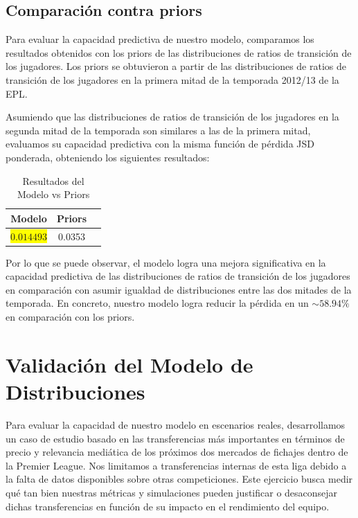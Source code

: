 \documentclass[
  a4paper,
]{article}
\begin{document}
\hypertarget{comparaciuxf3n-contra-priors}{%
\subsection{Comparación contra
priors}\label{comparaciuxf3n-contra-priors}}

Para evaluar la capacidad predictiva de nuestro modelo, comparamos los
resultados obtenidos con los priors de las distribuciones de ratios de
transición de los jugadores. Los priors se obtuvieron a partir de las
distribuciones de ratios de transición de los jugadores en la primera
mitad de la temporada 2012/13 de la EPL.

Asumiendo que las distribuciones de ratios de transición de los
jugadores en la segunda mitad de la temporada son similares a las de la
primera mitad, evaluamos su capacidad predictiva con la misma función de
pérdida JSD ponderada, obteniendo los siguientes resultados:

\begin{table}
\caption{Resultados del Modelo vs Priors}
\begin{center}
\begin{tabular}{|c|c|c|}
\hline
\textbf{Modelo} & \textbf{Priors} \\
\hline
\colorbox{yellow}{$0.014493$} & 0.0353 \\
\hline
\end{tabular}
\end{center}
\end{table}

Por lo que se puede observar, el modelo logra una mejora significativa
en la capacidad predictiva de las distribuciones de ratios de transición
de los jugadores en comparación con asumir igualdad de distribuciones
entre las dos mitades de la temporada. En concreto, nuestro modelo logra
reducir la pérdida en un \(\sim 58.94\%\) en comparación con los priors.

\newpage

\hypertarget{validaciuxf3n-del-modelo}{%
\section{\texorpdfstring{\textbf{Validación del Modelo de
Distribuciones}}{Validación del Modelo de Distribuciones}}\label{validaciuxf3n-del-modelo}}

Para evaluar la capacidad de nuestro modelo en escenarios reales,
desarrollamos un caso de estudio basado en las transferencias más
importantes en términos de precio y relevancia mediática de los próximos
dos mercados de fichajes dentro de la Premier League. Nos limitamos a
transferencias internas de esta liga debido a la falta de datos
disponibles sobre otras competiciones. Este ejercicio busca medir qué
tan bien nuestras métricas y simulaciones pueden justificar o
desaconsejar dichas transferencias en función de su impacto en el
rendimiento del equipo.
\end{document}
